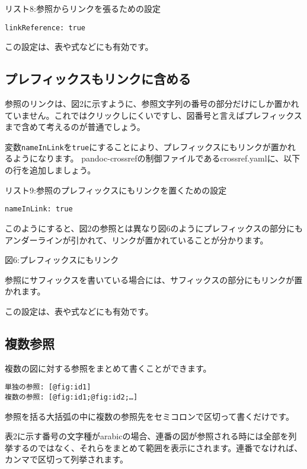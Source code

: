 リスト8:参照からリンクを張るための設定

\begin{verbatim}
linkReference: true
\end{verbatim}

この設定は、表や式などにも有効です。

\subsection{プレフィックスもリンクに含める}\label{ux30d7ux30ecux30d5ux30a3ux30c3ux30afux30b9ux3082ux30eaux30f3ux30afux306bux542bux3081ux308b}

参照のリンクは、図2に示すように、参照文字列の番号の部分だけにしか置かれていません。これではクリックしにくいですし、図番号と言えばプレフィックスまで含めて考えるのが普通でしょう。

変数\texttt{nameInLink}を\texttt{true}にすることにより、プレフィックスにもリンクが置かれるようになります。
pandoc-crossrefの制御ファイルであるcrossref.yamlに、以下の行を追加しましょう。

リスト9:参照のプレフィックスにもリンクを置くための設定

\begin{verbatim}
nameInLink: true
\end{verbatim}

このようにすると、図2の参照とは異なり図6のようにプレフィックスの部分にもアンダーラインが引かれて、リンクが置かれていることが分かります。

図6:プレフィックスにもリンク

参照にサフィックスを書いている場合には、サフィックスの部分にもリンクが置かれます。

この設定は、表や式などにも有効です。

\subsection{複数参照}\label{ux8907ux6570ux53c2ux7167}

複数の図に対する参照をまとめて書くことができます。

\begin{verbatim}
単独の参照: [@fig:id1]
複数の参照: [@fig:id1;@fig:id2;…]
\end{verbatim}

参照を括る大括弧の中に複数の参照先をセミコロンで区切って書くだけです。

表2に示す番号の文字種がarabicの場合、連番の図が参照される時には全部を列挙するのではなく、それらをまとめて範囲を表示にされます。連番でなければ、カンマで区切って列挙されます。

